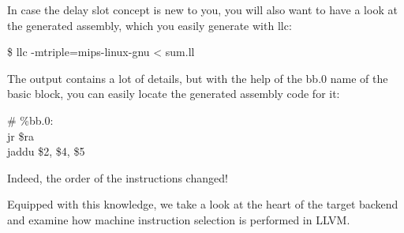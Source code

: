 In case the delay slot concept is new to you, you will also want to have a look at the generated assembly, which you easily generate with llc:\par

\begin{tcolorbox}[colback=white,colframe=black]
\$ llc -mtriple=mips-linux-gnu  < sum.ll
\end{tcolorbox}

The output contains a lot of details, but with the help of the bb.0 name of the basic block, you can easily locate the generated assembly code for it:\par

\begin{tcolorbox}[colback=white,colframe=black]
\# \%bb.0: \\
\hspace*{2cm}jr\hspace{1cm} \$ra \\
\hspace*{2cm}jaddu\hspace{0.5cm} \$2, \$4, \$5
\end{tcolorbox}

Indeed, the order of the instructions changed!\par

Equipped with this knowledge, we take a look at the heart of the target backend and examine how machine instruction selection is performed in LLVM.\par











